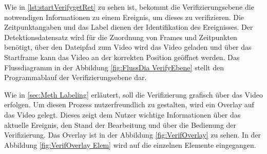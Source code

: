 Wie in \autoref{lst:startVerifygetRet} zu sehen ist, bekommt die Verifizierungsebene die notwendigen Informationen zu einem Ereignis, um dieses zu verifizieren. Die Zeitpunktangaben und das Label dienen der Identifikation des Ereignisses. Der Detektionsdatensatz wird für die Zuordnung von Frames und Zeitpunkten benötigt, über den Dateipfad zum Video wird das Video geladen und über das Startframe kann das Video an der korrekten Position geöffnet werden. Das Flussdiagramm in der Abbildung \ref{fig:FlussDia VerifyEbene} stellt den Programmablauf der Verifizierungsebene dar. 

Wie in \autoref{sec:Meth Labeling} erläutert, soll die Verifizierung grafisch über das Video erfolgen. Um diesen Prozess nutzerfreundlich zu gestalten, wird ein Overlay auf das Video gelegt. Dieses zeigt dem Nutzer wichtige Informationen über das aktuelle Ereignis, den Stand der Bearbeitung und über die Bedienung der Verifizierung. Das Overlay ist in der Abbildung \ref{fig:VerifOverlay} zu sehen. In der Abbildung \ref{fig:VerifOverlay Elem} wird auf die einzelnen Elemente eingegangen.


